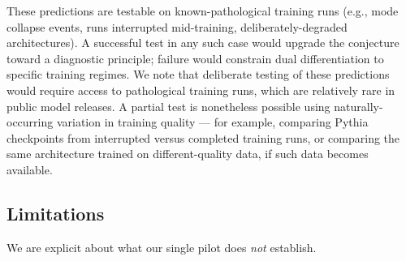 \documentclass{article}
\begin{document}
These predictions are testable on known-pathological training runs (e.g., mode collapse events, runs interrupted mid-training, deliberately-degraded architectures). A successful test in any such case would upgrade the conjecture toward a diagnostic principle; failure would constrain dual differentiation to specific training regimes. We note that deliberate testing of these predictions would require access to pathological training runs, which are relatively rare in public model releases. A partial test is nonetheless possible using naturally-occurring variation in training quality --- for example, comparing Pythia checkpoints from interrupted versus completed training runs, or comparing the same architecture trained on different-quality data, if such data becomes available.

\subsection{Limitations}

We are explicit about what our single pilot does \emph{not} establish.
\end{document}

